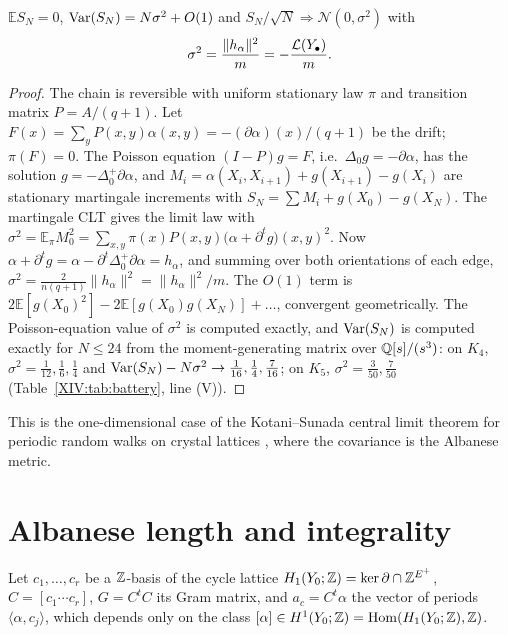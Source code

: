 \begin{theorem}\label{XIV:thm:diffusion}
$\mathbb E S_N=0$, $\operatorname{Var}(S_N)=N\sigma^{2}+O(1)$ and $S_N/\sqrt N\Rightarrow\mathcal N(0,\sigma^{2})$
with
\[
\sigma^{2}=\frac{\|h_\alpha\|^{2}}{m}=-\frac{\mathcal{L}(Y_\bullet)}{m}.
\]
\end{theorem}

\begin{proof}
The chain is reversible with uniform stationary law $\pi$ and transition matrix
$P=A/(q{+}1)$. Let $F(x)=\sum_yP(x,y)\alpha(x,y)=-(\partial\alpha)(x)/(q{+}1)$ be the
drift; $\pi(F)=0$. The Poisson equation $(I-P)g=F$, i.e.\ $\Delta_0g=-\partial\alpha$, has
the solution $g=-\Delta_0^{+}\partial\alpha$, and $M_i=\alpha(X_i,X_{i+1})+g(X_{i+1})-g(X_i)$
are stationary martingale increments with $S_N=\sum M_i+g(X_0)-g(X_N)$. The martingale
CLT gives the limit law with $\sigma^{2}=\mathbb E_\pi M_0^{2}=\sum_{x,y}\pi(x)P(x,y)
\bigl(\alpha+\partial^{t}g\bigr)(x,y)^{2}$. Now $\alpha+\partial^{t}g=\alpha-\partial^{t}\Delta_0^{+}\partial\alpha
=h_\alpha$, and summing over both orientations of each edge,
$\sigma^{2}=\frac{2}{n(q+1)}\|h_\alpha\|^{2}=\|h_\alpha\|^{2}/m$. The $O(1)$ term is
$2\mathbb E[g(X_0)^2]-2\mathbb E[g(X_0)g(X_N)]+\dots$, convergent geometrically. The
Poisson-equation value of $\sigma^{2}$ is computed exactly, and $\operatorname{Var}(S_N)$ is computed
exactly for $N\le24$ from the moment-generating matrix over $\mathbb{Q}[s]/(s^{3})$: on $K_4$,
$\sigma^{2}=\frac1{12},\frac16,\frac14$ and $\operatorname{Var}(S_N)-N\sigma^{2}\to\frac1{16},\frac14,\frac7{16}$;
on $K_5$, $\sigma^{2}=\frac3{50},\frac7{50}$ (Table~\ref{XIV:tab:battery}, line (V)).
\end{proof}

This is the one-dimensional case of the Kotani--Sunada central limit theorem for periodic
random walks on crystal lattices \cite{KS1}, where the covariance is the Albanese metric.

\section{Albanese length and integrality}\label{XIV:sec:albanese}

Let $c_1,\dots,c_r$ be a $\mathbb{Z}$-basis of the cycle lattice $H_1(Y_0;\mathbb{Z})=\ker\partial\cap\mathbb{Z}^{E^{+}}$,
$C=[c_1\cdots c_r]$, $G=C^{t}C$ its Gram matrix, and $a_c=C^{t}\alpha$ the vector of
periods $\langle\alpha,c_j\rangle$, which depends only on the class $[\alpha]\in H^{1}(Y_0;\mathbb{Z})
=\operatorname{Hom}(H_1(Y_0;\mathbb{Z}),\mathbb{Z})$.

